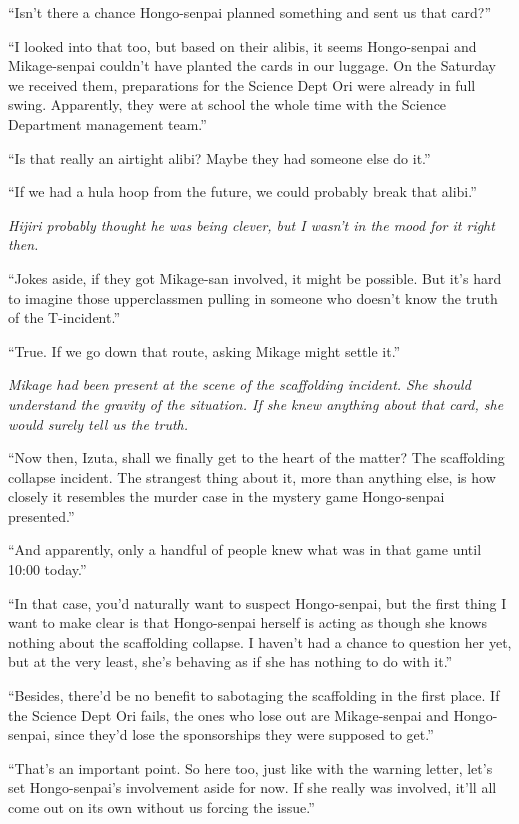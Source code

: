 \documentclass[
    a4paper,
    12pt,
    twoside,
    openany,
    UTF8,
    fontset=windows
]{ctexbook}
\begin{document}
``Isn't there a chance Hongo-senpai planned something and sent us that card?''

``I looked into that too, but based on their alibis, it seems Hongo-senpai and Mikage-senpai couldn't have planted the cards in our luggage. On the Saturday we received them, preparations for the Science Dept Ori were already in full swing. Apparently, they were at school the whole time with the Science Department management team.''

``Is that really an airtight alibi? Maybe they had someone else do it.''

``If we had a hula hoop from the future, we could probably break that alibi.''

\textit{Hijiri probably thought he was being clever, but I wasn't in the mood for it right then.}

``Jokes aside, if they got Mikage-san involved, it might be possible. But it's hard to imagine those upperclassmen pulling in someone who doesn't know the truth of the T-incident.''

``True. If we go down that route, asking Mikage might settle it.''

\textit{Mikage had been present at the scene of the scaffolding incident. She should understand the gravity of the situation. If she knew anything about that card, she would surely tell us the truth.}

``Now then, Izuta, shall we finally get to the heart of the matter? The scaffolding collapse incident. The strangest thing about it, more than anything else, is how closely it resembles the murder case in the mystery game Hongo-senpai presented.''

``And apparently, only a handful of people knew what was in that game until 10:00 today.''

``In that case, you'd naturally want to suspect Hongo-senpai, but the first thing I want to make clear is that Hongo-senpai herself is acting as though she knows nothing about the scaffolding collapse. I haven't had a chance to question her yet, but at the very least, she's behaving as if she has nothing to do with it.''

``Besides, there'd be no benefit to sabotaging the scaffolding in the first place. If the Science Dept Ori fails, the ones who lose out are Mikage-senpai and Hongo-senpai, since they'd lose the sponsorships they were supposed to get.''

``That's an important point. So here too, just like with the warning letter, let's set Hongo-senpai's involvement aside for now. If she really was involved, it'll all come out on its own without us forcing the issue.''
\end{document}
